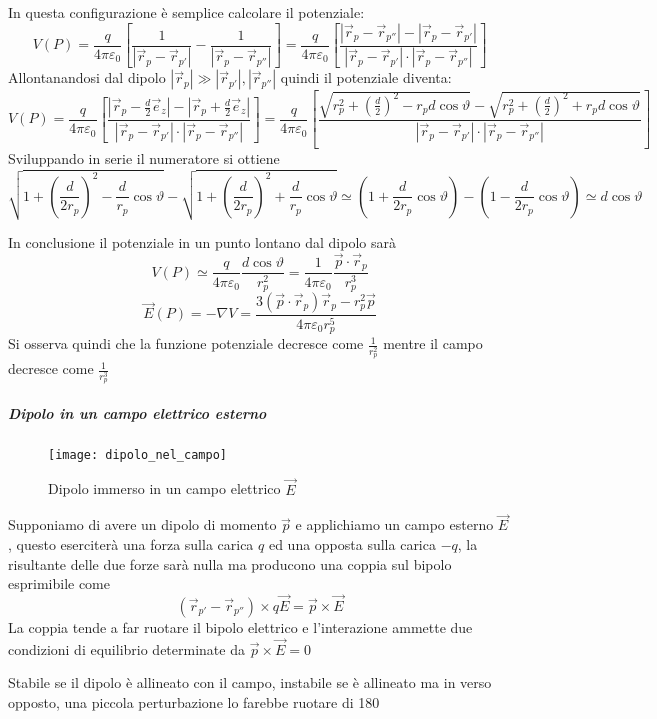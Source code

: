In questa configurazione è semplice calcolare il potenziale:
$$
V(P) = \frac{q}{4\pi\varepsilon_0}\left[ \frac{1}{|\vec{r}_p-\vec{r}_{p'}|} - \frac{1}{|\vec{r}_p-\vec{r}_{p''}|} \right] = 
\frac{q}{4\pi\varepsilon_0} \left[ \frac{|\vec{r}_p-\vec{r}_{p''}|-|\vec{r}_p-\vec{r}_{p'}|}
{|\vec{r}_p-\vec{r}_{p'}|\cdot|\vec{r}_p-\vec{r}_{p''}|} \right]
$$
Allontanandosi dal dipolo $|\vec{r}_p| \gg |\vec{r}_{p'}|,|\vec{r}_{p''}|$ quindi il potenziale
diventa:
$$
V(P) = \frac{q}{4\pi\varepsilon_0} \left[ \frac{|\vec{r}_p-\frac{d}{2}\vec{e}_z|-|\vec{r}_p + \frac{d}{2}\vec{e}_z|}
{|\vec{r}_p-\vec{r}_{p'}|\cdot|\vec{r}_p-\vec{r}_{p''}|} \right] = 
\frac{q}{4\pi\varepsilon_0} \left[ \frac{\sqrt{r_p^2 + \left(\frac{d}{2}\right)^2-r_p d \cos \vartheta} - \sqrt{r_p^2 + \left(\frac{d}{2}\right)^2 + r_p d \cos \vartheta}}
{|\vec{r}_p-\vec{r}_{p'}|\cdot|\vec{r}_p-\vec{r}_{p''}|} \right] 
$$
Sviluppando in serie il numeratore si ottiene
$$
 \sqrt{1 + \left(\frac{d}{2r_p}\right)^2- 
\frac{d}{r_p} \cos \vartheta} - \sqrt{1 + \left(\frac{d}{2r_p}\right)^2 + \frac{d}{r_p} \cos \vartheta} \simeq %
\left(1 + \frac{d}{2r_p} \cos \vartheta\right) - \left(1 - \frac{d}{2r_p} \cos \vartheta\right)
\simeq d\cos\vartheta
$$

In conclusione il potenziale in un punto lontano dal dipolo sarà
$$
V(P) \simeq \frac{q}{4\pi\varepsilon_0} \frac{d\cos\vartheta}{r_p^2} = \frac{1}{4\pi\varepsilon_0}
\frac{\vec{p}\cdot\vec{r}_p}{r_p^3}
$$
$$
\vec{E}(P) = -\nabla V = \frac{3\left(\vec{p}\cdot\vec{r}_p\right)\vec{r}_p - r_p^2\vec{p}}{4\pi\varepsilon_0r_p^5}
$$
Si osserva quindi che la funzione potenziale decresce come $\frac{1}{r_p^2}$ mentre il 
campo decresce come $\frac{1}{r_p^3}$

\subparagraph{Dipolo in un campo elettrico esterno}
\begin{figure}[h!]
\centering
\texttt{[image: dipolo\_nel\_campo]}
\caption{Dipolo immerso in un campo elettrico $\vec{E}$}
\end{figure}
Supponiamo di avere un dipolo di momento $\vec{p}$ e applichiamo un campo esterno $\vec{E}$,
questo eserciterà una forza sulla carica $q$ ed una opposta sulla carica $-q$, la risultante delle 
due forze sarà nulla ma producono una coppia sul bipolo esprimibile come
$$
\left(\vec{r}_{p'} - \vec{r}_{p''}\right)\times q\vec{E} = \vec{p}\times\vec{E}
$$
La coppia tende a far ruotare il bipolo elettrico e l'interazione ammette due condizioni di 
equilibrio determinate da $\vec{p}\times\vec{E} = 0 $

Stabile se il dipolo è allineato con il campo, instabile se è allineato ma in verso opposto,
una piccola perturbazione lo farebbe ruotare di 180\textdegree

